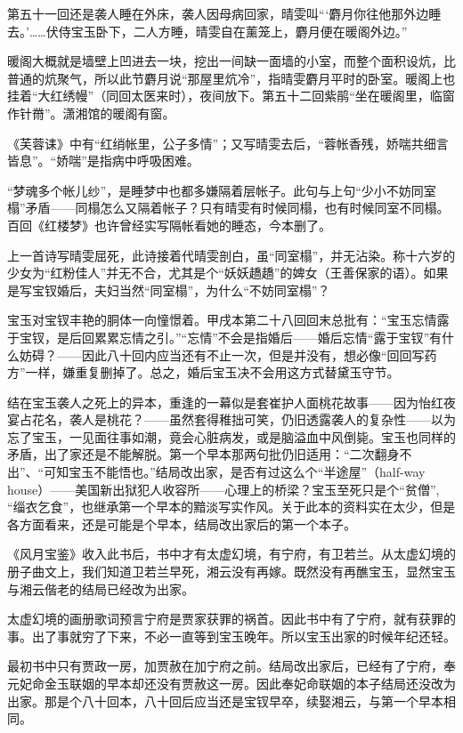 \par 第五十一回还是袭人睡在外床，袭人因母病回家，晴雯叫“‘麝月你往他那外边睡去。'……伏侍宝玉卧下，二人方睡，晴雯自在薰笼上，麝月便在暖阁外边。”
\par 暖阁大概就是墙壁上凹进去一块，挖出一间缺一面墙的小室，而整个面积设炕，比普通的炕聚气，所以此节麝月说“那屋里炕冷”，指晴雯麝月平时的卧室。暖阁上也挂着“大红绣幔”（同回太医来时），夜间放下。第五十二回紫鹃“坐在暖阁里，临窗作针黹”。潇湘馆的暖阁有窗。
\par 《芙蓉诔》中有“红绡帐里，公子多情”；又写晴雯去后，“蓉帐香残，娇喘共细言皆息”。“娇喘”是指病中呼吸困难。
\par “梦魂多个帐儿纱”，是睡梦中也都多嫌隔着层帐子。此句与上句“少小不妨同室榻”矛盾——同榻怎么又隔着帐子？只有晴雯有时候同榻，也有时候同室不同榻。百回《红楼梦》也许曾经实写隔帐看她的睡态，今本删了。
\par 上一首诗写晴雯屈死，此诗接着代晴雯剖白，虽“同室榻”，并无沾染。称十六岁的少女为“红粉佳人”并无不合，尤其是个“妖妖趫趫”的婢女（王善保家的语）。如果是写宝钗婚后，夫妇当然“同室榻”，为什么“不妨同室榻”？
\par 宝玉对宝钗丰艳的胴体一向憧憬着。甲戌本第二十八回回末总批有：“宝玉忘情露于宝钗，是后回累累忘情之引。”“忘情”不会是指婚后——婚后忘情“露于宝钗”有什么妨碍？——因此八十回内应当还有不止一次，但是并没有，想必像“回回写药方”一样，嫌重复删掉了。总之，婚后宝玉决不会用这方式替黛玉守节。
\par 结在宝玉袭人之死上的异本，重逢的一幕似是套崔护人面桃花故事——因为怡红夜宴占花名，袭人是桃花？——虽然套得稚拙可笑，仍旧透露袭人的复杂性——以为忘了宝玉，一见面往事如潮，竟会心脏病发，或是脑溢血中风倒毙。宝玉也同样的矛盾，出了家还是不能解脱。第一个早本那两句批仍旧适用：“二次翻身不出”、“可知宝玉不能悟也。”结局改出家，是否有过这么个“半途屋”（half-way house）——美国新出狱犯人收容所——心理上的桥梁？宝玉至死只是个“贫僧”, “缁衣乞食”，也继承第一个早本的黯淡写实作风。关于此本的资料实在太少，但是各方面看来，还是可能是个早本，结局改出家后的第一个本子。
\par 《风月宝鉴》收入此书后，书中才有太虚幻境，有宁府，有卫若兰。从太虚幻境的册子曲文上，我们知道卫若兰早死，湘云没有再嫁。既然没有再醮宝玉，显然宝玉与湘云偕老的结局已经改为出家。
\par 太虚幻境的画册歌词预言宁府是贾家获罪的祸首。因此书中有了宁府，就有获罪的事。出了事就穷了下来，不必一直等到宝玉晚年。所以宝玉出家的时候年纪还轻。
\par 最初书中只有贾政一房，加贾赦在加宁府之前。结局改出家后，已经有了宁府，奉元妃命金玉联姻的早本却还没有贾赦这一房。因此奉妃命联姻的本子结局还没改为出家。那是个八十回本，八十回后应当还是宝钗早卒，续娶湘云，与第一个早本相同。
